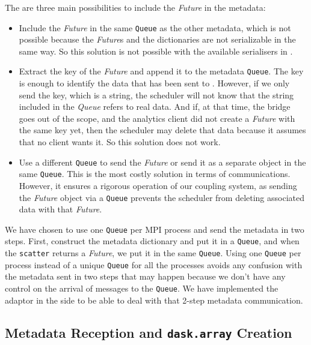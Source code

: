 The are three main possibilities to include the \textit{Future} in the metadata: 
\begin{itemize}
    \item Include the \textit{Future} in the same \texttt{Queue} as the other metadata, which is not possible because the \textit{Future}s and the dictionaries are not serializable in the same way. So this solution is not possible with the available serialisers in \dask. 
    
    \item Extract the key of the \textit{Future} and append it to the metadata \texttt{Queue}. The key is enough to identify the data that has been sent to \dask. However, if we only send the key, which is a string, the scheduler will not know that the string included in the \textit{Queue} refers to real data. And if, at that time, the bridge goes out of the scope, and the analytics client did not create a \textit{Future} with the same key yet, then the scheduler may delete that data because it assumes that no client wants it. So this solution does not work.
    
    \item Use a different \texttt{Queue} to send the \textit{Future} or send it as a separate object in the same \texttt{Queue}. This is the most costly solution in terms of communications. However, it ensures a rigorous operation of our coupling system, as sending the \textit{Future} object via a \texttt{Queue} prevents the scheduler from deleting associated data with that \textit{Future}. 
\end{itemize}

We have chosen to use one \texttt{Queue} per MPI process and send the metadata in two steps. First, construct the metadata dictionary and put it in a \texttt{Queue}, and when the \texttt{scatter} returns a \textit{Future}, we put it in the same \texttt{Queue}. 
Using one \texttt{Queue} per process instead of a unique \texttt{Queue} for all the processes avoids any confusion with  the metadata sent in two steps that may happen because we don't have any control on the arrival of messages to the \texttt{Queue}. 
We have implemented the \deisa adaptor in the \dask side to be able to deal with that 2-step metadata communication.


\subsection{Metadata Reception and \texttt{dask.array} Creation} 

